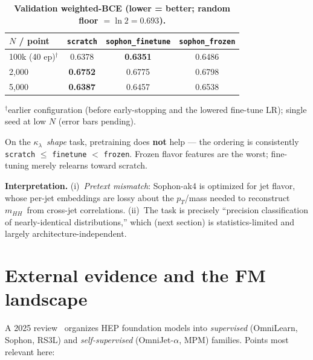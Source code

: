 \documentclass[11pt]{article}
\newcommand{\kl}{\ensuremath{\kappa_\lambda}}
\newcommand{\mhh}{\ensuremath{m_{HH}}}
\begin{document}
\begin{table}[h]
\centering\small
\caption*{\textbf{Validation weighted-BCE (lower = better; random floor $=\ln 2 = 0.693$).}}
\begin{tabular}{@{}lccc@{}}
\toprule
$N$ / point & \texttt{scratch} & \texttt{sophon\_finetune} & \texttt{sophon\_frozen} \\
\midrule
100k (40 ep)$^\dagger$ & 0.6378 & \textbf{0.6351} & 0.6486 \\
2{,}000          & \textbf{0.6752} & 0.6775 & 0.6798 \\
5{,}000          & \textbf{0.6387} & 0.6457 & 0.6538 \\
\bottomrule
\end{tabular}
\end{table}
\vspace{-0.4em}
{\footnotesize $^\dagger$earlier configuration (before early-stopping and the lowered
fine-tune LR); single seed at low $N$ (error bars pending).}

\begin{takeaway}
On the \kl\ \emph{shape} task, pretraining does \textbf{not} help --- the ordering is
consistently \texttt{scratch} $\le$ \texttt{finetune} $<$ \texttt{frozen}. Frozen
flavor features are the worst; fine-tuning merely relearns toward scratch.
\end{takeaway}

\noindent\textbf{Interpretation.} (i)~\emph{Pretext mismatch}: Sophon-ak4 is optimized
for jet flavor, whose per-jet embeddings are lossy about the $p_T$/mass needed to
reconstruct \mhh\ from cross-jet correlations. (ii)~The task is precisely
``precision classification of nearly-identical distributions,'' which (next section)
is statistics-limited and largely architecture-independent.

\section{External evidence and the FM landscape}
A 2025 review~\cite{fmreview} organizes HEP foundation models into \emph{supervised}
(OmniLearn, Sophon, RS3L) and \emph{self-supervised} (OmniJet-$\alpha$, MPM) families.
Points most relevant here:
\end{document}
